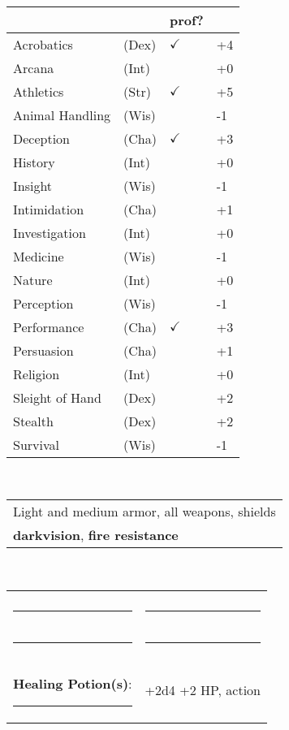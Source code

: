 \documentclass[twocolumn]{article}
\begin{document}
\\
\noindent\begin{tabular}{llll}
 & & prof? & \\
\hline
Acrobatics & (Dex) & $\checkmark$ &+4 \\
Arcana & (Int) &  & +0 \\ 
Athletics & (Str) & $\checkmark$ & +5\\
Animal Handling & (Wis) &  & -1\\
Deception & (Cha) & $\checkmark$ & +3 \\
History & (Int) &  & +0 \\
Insight & (Wis) &  & -1 \\
Intimidation & (Cha) &  & +1 \\
Investigation & (Int) &  & +0 \\
Medicine & (Wis) &  & -1 \\
Nature & (Int) &  & +0 \\
Perception & (Wis) &  & -1 \\
Performance & (Cha) & $\checkmark$ & +3 \\
Persuasion & (Cha) &  & +1 \\
Religion & (Int) &  & +0 \\
Sleight of Hand & (Dex) &  & +2 \\
Stealth & (Dex) &  & +2 \\
Survival & (Wis) &  & -1 \\
\hline
\end{tabular}
\vspace{12pt}

\\
\noindent\begin{tabular}{|m{3.1in}|}
\hline
Light and medium armor, all weapons, shields \\
\textbf{darkvision}, \textbf{fire resistance} \\
\hline
\end{tabular}
\vspace{12pt}


\\
\noindent\begin{tabular}{|ll|}
\hline&\\
\rule{1.4in}{.2pt}&\rule{1.4in}{.2pt}\\
\rule{1.4in}{.2pt}&\rule{1.4in}{.2pt}\\
\textbf{Healing Potion(s)}: \rule{.2in}{.2pt}& +2d4 +2 HP, {\sc action}\\
\hline
\end{tabular}
\vspace{12pt}
\end{document}
